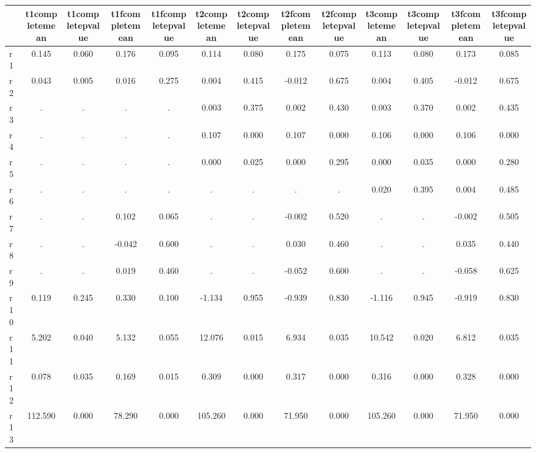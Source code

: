 \begin{table}[htbp]
\begin{tabular}{lcccccccccccc} \hline \hline
 & t1completemean  & t1completepvalue  & t1fcompletemean  & t1fcompletepvalue  & t2completemean  & t2completepvalue  & t2fcompletemean  & t2fcompletepvalue  & t3completemean  & t3completepvalue  & t3fcompletemean  & t3fcompletepvalue  \\  \hline 
r1 &     0.145 &     0.060 &     0.176 &     0.095 &     0.114 &     0.080 &     0.175 &     0.075 &     0.113 &     0.080 &     0.173 &     0.085 \\  
r2 &     0.043 &     0.005 &     0.016 &     0.275 &     0.004 &     0.415 &    -0.012 &     0.675 &     0.004 &     0.405 &    -0.012 &     0.675 \\  
r3 &         . &         . &         . &         . &     0.003 &     0.375 &     0.002 &     0.430 &     0.003 &     0.370 &     0.002 &     0.435 \\  
r4 &         . &         . &         . &         . &     0.107 &     0.000 &     0.107 &     0.000 &     0.106 &     0.000 &     0.106 &     0.000 \\  
r5 &         . &         . &         . &         . &     0.000 &     0.025 &     0.000 &     0.295 &     0.000 &     0.035 &     0.000 &     0.280 \\  
r6 &         . &         . &         . &         . &         . &         . &         . &         . &     0.020 &     0.395 &     0.004 &     0.485 \\  
r7 &         . &         . &     0.102 &     0.065 &         . &         . &    -0.002 &     0.520 &         . &         . &    -0.002 &     0.505 \\  
r8 &         . &         . &    -0.042 &     0.600 &         . &         . &     0.030 &     0.460 &         . &         . &     0.035 &     0.440 \\  
r9 &         . &         . &     0.019 &     0.460 &         . &         . &    -0.052 &     0.600 &         . &         . &    -0.058 &     0.625 \\  
r10 &     0.119 &     0.245 &     0.330 &     0.100 &    -1.134 &     0.955 &    -0.939 &     0.830 &    -1.116 &     0.945 &    -0.919 &     0.830 \\  
r11 &     5.202 &     0.040 &     5.132 &     0.055 &    12.076 &     0.015 &     6.934 &     0.035 &    10.542 &     0.020 &     6.812 &     0.035 \\  
r12 &     0.078 &     0.035 &     0.169 &     0.015 &     0.309 &     0.000 &     0.317 &     0.000 &     0.316 &     0.000 &     0.328 &     0.000 \\  
r13 &   112.590 &     0.000 &    78.290 &     0.000 &   105.260 &     0.000 &    71.950 &     0.000 &   105.260 &     0.000 &    71.950 &     0.000 \\  
\hline \hline \end{tabular}
\end{table}
